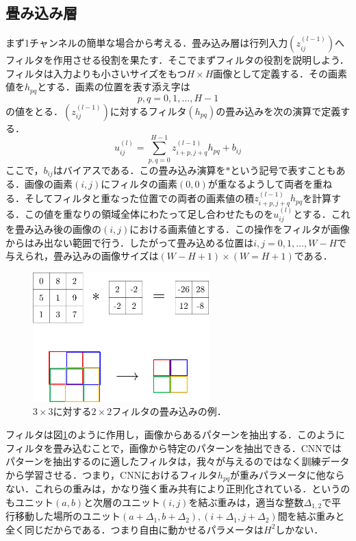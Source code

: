 \documentclass[a4paper,11pt]{jsreport}
\begin{document}
\subsection{畳み込み層}
まず1チャンネルの簡単な場合から考える．畳み込み層は行列入力$(z_{ij}^{(l-1)})$へフィルタを作用させる役割を果たす．そこでまずフィルタの役割を説明しよう．フィルタは入力よりも小さいサイズをもつ$H \times H$画像として定義する．その画素値を$h_{pq}$とする．画素の位置を表す添え字は
\begin{equation}
  p,q = 0,1,\dots,H-1
\end{equation}
の値をとる．$(z_{ij}^{(l-1)})$に対するフィルタ$(h_{pq})$の畳み込みを次の演算で定義する．
\begin{equation}
  u_{ij}^{(l)}
  = \sum_{p,q=0}^{H-1} z_{i+p,j+q}^{(l-1)} h_{pq} + b_{ij}
\end{equation}
ここで，$b_{ij}$はバイアスである．この畳み込み演算を$\ast$という記号で表すこともある．画像の画素$(i,j)$にフィルタの画素$(0,0)$が重なるようして両者を重ねる．そしてフィルタと重なった位置での両者の画素値の積$z_{i+p,j+q}^{(l-1)} h_{pq}$を計算する．この値を重なりの領域全体にわたって足し合わせたものを$u_{ij}^{(l)}$とする．これを畳み込み後の画像の$(i,j)$における画素値とする．この操作をフィルタが画像からはみ出ない範囲で行う．したがって畳み込める位置は$i,j=0,1,\dots,W-H$で与えられ，畳み込みの画像サイズは$(W-H+1)\times(W=H+1)$である．\par
\begin{figure}[H]
   \begin{center}
       \includegraphics[height=5cm]{image/畳み込み演算の例.png}
       \caption{$3 \times 3$に対する$2 \times 2$フィルタの畳み込みの例．}
       \label{畳み込み演算の例}
   \end{center}
\end{figure}
フィルタは図\ref{畳み込み演算の例}のように作用し，画像からあるパターンを抽出する．このようにフィルタを畳み込むことで，画像から特定のパターンを抽出できる．CNNではパターンを抽出するのに適したフィルタは，我々が与えるのではなく訓練データから学習させる．つまり，CNNにおけるフィルタ$h_{pq}$が重みパラメータに他ならない．これらの重みは，かなり強く重み共有により正則化されている．というのもユニット$(a,b)$と次層のユニット$(i,j)$を結ぶ重みは，適当な整数$\Delta_{1,2}$で平行移動した場所のユニット$(a+\Delta_1,b+\Delta_2),(i+\Delta_1,j+\Delta_2)$間を結ぶ重みと全く同じだからである．つまり自由に動かせるパラメータは$H^2$しかない．\par
\end{document}
